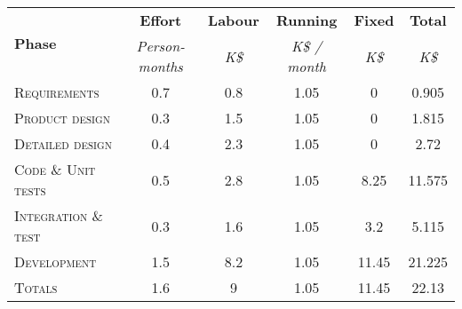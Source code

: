 \begin{tabular}{l|c|cccc}
\multirow{2}{*}{\textbf{Phase}} & \textbf{Effort} & \textbf{Labour} & \textbf{Running} & \textbf{Fixed} & \textbf{Total} \\
& \textit{Person-months} & \textit{K\$} & \textit{K\$ / month} & \textit{K\$} & \textit{K\$} \\
\textsc{Requirements} & 0.7 & 0.8 & 1.05 & 0 & 0.905  \\
\textsc{Product design} & 0.3 & 1.5 & 1.05 & 0 & 1.815  \\
\textsc{Detailed design} & 0.4 & 2.3 & 1.05 & 0 & 2.72  \\
\textsc{Code \& Unit tests} & 0.5 & 2.8 & 1.05 & 8.25 & 11.575  \\
\textsc{Integration \& test} & 0.3 & 1.6 & 1.05 & 3.2 & 5.115  \\ \hline
\textsc{Development} & 1.5 & 8.2 & 1.05 & 11.45 & 21.225  \\
\textsc{Totals} & 1.6 & 9 & 1.05 & 11.45 & 22.13
\end{tabular}
